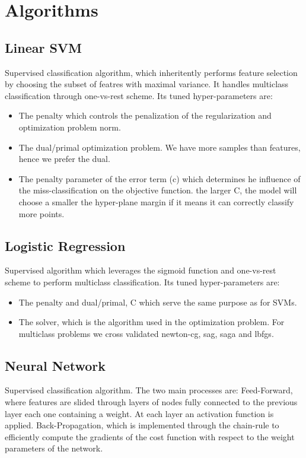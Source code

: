 \documentclass[10pt, hidelinks]{article}
\begin{document}
\section*{Algorithms}
\subsection*{Linear SVM}
Supervised classification algorithm, which inheritently performs feature selection by choosing the subset of featres with maximal variance. It handles multiclass classification through one-vs-rest scheme. Its tuned hyper-parameters are:
\begin{itemize}
    \item The penalty which controls the penalization of the regularization and optimization problem norm.
    \item The dual/primal optimization problem. We have more samples than features, hence we prefer the dual.
    \item The penalty parameter of the error term (c) which determines he influence of the miss-classification on the objective function. the larger C, the model will choose a smaller the hyper-plane margin if it means it can correctly classify more points. 
\end{itemize}
\subsection*{Logistic Regression}
Supervised algorithm which leverages the sigmoid function and one-vs-rest scheme to perform multiclass classification. Its tuned hyper-parameters are:
\begin{itemize}
    \item The penalty and dual/primal, C which serve the same purpose as for SVMs.
    \item The solver, which is the algorithm used in the optimization problem. For multiclass problems we cross validated newton-cg, sag, saga and lbfgs.
\end{itemize}
\subsection*{Neural Network}
Supervised classification algorithm. The two main processes are: Feed-Forward, where features are slided through layers of nodes fully connected to the previous layer each one containing a weight. At each layer an activation function is applied. Back-Propagation, which is implemented through the chain-rule to efficiently compute the gradients of the cost function with respect to the weight parameters of the network.
\end{document}
